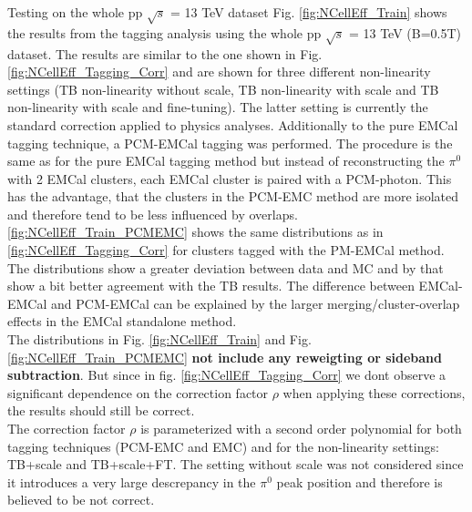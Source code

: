 \documentclass[ALICE]{ALICE_analysis_notes}
\newcommand{\PZ}{$\pi^0$\xspace}
\begin{document}
\begin{section}{Testing on the whole pp $\sqrt{s}$ = 13 TeV dataset}
	Fig. \ref{fig:NCellEff_Train} shows the results from the tagging analysis using the whole pp $\sqrt{s}$ = 13 TeV (B=0.5T) dataset. The results are similar to the one shown in Fig. \ref{fig:NCellEff_Tagging_Corr} and are shown for three different non-linearity settings (TB non-linearity without scale, TB non-linearity with scale and TB non-linearity with scale and fine-tuning). The latter setting is currently the standard correction applied to physics analyses. Additionally to the pure EMCal tagging technique, a PCM-EMCal tagging was performed. The procedure is the same as for the pure EMCal tagging method but instead of reconstructing the \PZ with 2 EMCal clusters, each EMCal cluster is paired with a PCM-photon. This has the advantage, that the clusters in the PCM-EMC method are more isolated and therefore tend to be less influenced by overlaps. \ref{fig:NCellEff_Train_PCMEMC} shows the same distributions as in \ref{fig:NCellEff_Tagging_Corr} for clusters tagged with the PM-EMCal method. The distributions show a greater deviation between data and MC and by that show a bit better agreement with the TB results. The difference between EMCal-EMCal and PCM-EMCal can be explained by the larger merging/cluster-overlap effects in the EMCal standalone method.\\
	The distributions in Fig. \ref{fig:NCellEff_Train} and Fig.  \ref{fig:NCellEff_Train_PCMEMC} \textbf{not include any reweigting or sideband subtraction}. But since in fig. \ref{fig:NCellEff_Tagging_Corr} we dont observe a significant dependence on the correction factor $\rho$ when applying these corrections, the results should still be correct.\\
	The correction factor $\rho$ is parameterized with a second order polynomial for both tagging techniques (PCM-EMC and EMC) and for the non-linearity settings: TB+scale and TB+scale+FT. The setting without scale was not considered since it introduces a very large descrepancy in the \PZ peak position and therefore is believed to be not correct.
	
\end{section}
\end{document}
